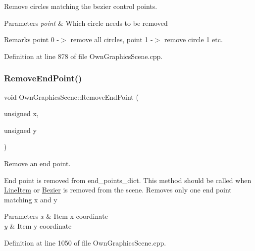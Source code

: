 Remove circles matching the bezier control points. 


\begin{DoxyParams}{Parameters}
{\em point} & Which circle needs to be removed \\
\hline
\end{DoxyParams}
\begin{DoxyRemark}{Remarks}
point 0 -\/$>$ remove all circles, point 1 -\/$>$ remove circle 1 etc. 
\end{DoxyRemark}


Definition at line 878 of file Own\+Graphics\+Scene.\+cpp.

\mbox{\label{classOwnGraphicsScene_a4f029a37e96fc022295ce4e421319ddf}} 
\subsubsection{\texorpdfstring{Remove\+End\+Point()}{RemoveEndPoint()}}
{\footnotesize\ttfamily void Own\+Graphics\+Scene\+::\+Remove\+End\+Point (\begin{DoxyParamCaption}\item[{unsigned}]{x,  }\item[{unsigned}]{y }\end{DoxyParamCaption})}



Remove an end point. 

End point is removed from end\+\_\+points\+\_\+dict. This method should be called when \mbox{\hyperlink{classLineItem}{Line\+Item}} or \mbox{\hyperlink{classBezier}{Bezier}} is removed from the scene. Removes only one end point matching x and y 
\begin{DoxyParams}{Parameters}
{\em x} & Item x coordinate \\
\hline
{\em y} & Item y coordinate \\
\hline
\end{DoxyParams}


Definition at line 1050 of file Own\+Graphics\+Scene.\+cpp.

\mbox{\label{classOwnGraphicsScene_a4b1ba1b97b89baad08c3ba5471ebb61f}} 
